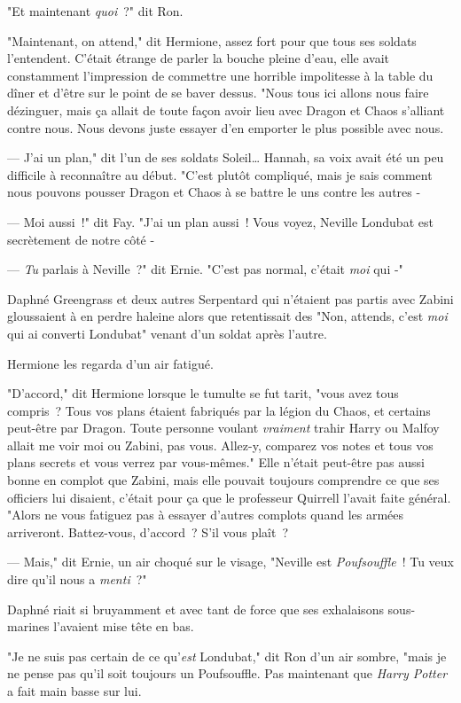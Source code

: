 "Et maintenant \emph{quoi}~?" dit Ron.

"Maintenant, on attend," dit Hermione, assez fort pour que tous ses soldats l'entendent. C'était étrange de parler la bouche pleine d'eau, elle avait constamment l'impression de commettre une horrible impolitesse à la table du dîner et d'être sur le point de se baver dessus. "Nous tous ici allons nous faire dézinguer, mais ça allait de toute façon avoir lieu avec Dragon et Chaos s'alliant contre nous. Nous devons juste essayer d'en emporter le plus possible avec nous.

--- J'ai un plan," dit l'un de ses soldats Soleil… Hannah, sa voix avait été un peu difficile à reconnaître au début. "C'est plutôt compliqué, mais je sais comment nous pouvons pousser Dragon et Chaos à se battre le uns contre les autres -

--- Moi aussi~!" dit Fay. "J'ai un plan aussi~! Vous voyez, Neville Londubat est secrètement de notre côté -

--- \emph{Tu} parlais à Neville~?" dit Ernie. "C'est pas normal, c'était \emph{moi} qui -"

Daphné Greengrass et deux autres Serpentard qui n'étaient pas partis avec Zabini gloussaient à en perdre haleine alors que retentissait des "Non, attends, c'est \emph{moi} qui ai converti Londubat" venant d'un soldat après l'autre.

Hermione les regarda d'un air fatigué.

"D'accord," dit Hermione lorsque le tumulte se fut tarit, "vous avez tous compris~? Tous vos plans étaient fabriqués par la légion du Chaos, et certains peut-être par Dragon. Toute personne voulant \emph{vraiment} trahir Harry ou Malfoy allait me voir moi ou Zabini, pas vous. Allez-y, comparez vos notes et tous vos plans secrets et vous verrez par vous-mêmes." Elle n'était peut-être pas aussi bonne en complot que Zabini, mais elle pouvait toujours comprendre ce que ses officiers lui disaient, c'était pour ça que le professeur Quirrell l'avait faite général. "Alors ne vous fatiguez pas à essayer d'autres complots quand les armées arriveront. Battez-vous, d'accord~? S'il vous plaît~?

--- Mais," dit Ernie, un air choqué sur le visage, "Neville est \emph{Poufsouffle}~! Tu veux dire qu'il nous a \emph{menti}~?"

Daphné riait si bruyamment et avec tant de force que ses exhalaisons sous-marines l'avaient mise tête en bas.

"Je ne suis pas certain de ce qu'\emph{est} Londubat," dit Ron d'un air sombre, "mais je ne pense pas qu'il soit toujours un Poufsouffle. Pas maintenant que \emph{Harry Potter} a fait main basse sur lui.

